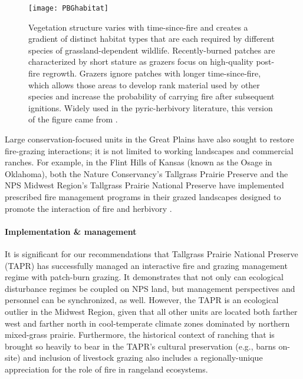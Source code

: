 \begin{figure}[!b]
	\center
	\texttt{[image: PBGhabitat]}
	\caption[Vegetation structure, grassland birds, and the fire-grazing interaction]
	{Vegetation structure varies with time-since-fire and creates a gradient of distinct habitat types that are each required by different species of grassland-dependent wildlife. 
	Recently-burned patches are characterized by short stature as grazers focus on high-quality post-fire regrowth. 
	Grazers ignore patches with longer time-since-fire, which allows those areas to develop rank material used by other species and increase the probability of carrying fire after subsequent ignitions.
	Widely used in the pyric-herbivory literature, this version of the figure came from \citet{fuhlendorf2009}.}
	\label{fig:habitat}
\end{figure}

Large conservation-focused units in the Great Plains have also sought to restore fire-grazing interactions; it is not limited to working landscapes and commercial ranches. 
For example, in the Flint Hills of Kansas (known as the Osage in Oklahoma), both the Nature Conservancy's Tallgrass Prairie Preserve and the NPS Midwest Region's Tallgrass Prairie National Preserve have implemented prescribed fire management programs in their grazed landscapes designed to promote the interaction of fire and herbivory \citep{hamilton2007, leis2013}. 

\paragraph{Implementation \& management}

It is significant for our recommendations that Tallgrass Prairie National Preserve (TAPR) has successfully managed an interactive fire and grazing management regime with patch-burn grazing. 
It demonstrates that not only can ecological disturbance regimes be coupled on NPS land, but management perspectives and personnel can be synchronized, as well. 
However, the TAPR is an ecological outlier in the Midwest Region, given that all other units are located both farther west and farther north in cool-temperate climate zones dominated by northern mixed-grass prairie. 
Furthermore, the historical context of ranching that is brought so heavily to bear in the TAPR's cultural preservation (e.g., barns on-site) and inclusion of livestock grazing also includes a regionally-unique appreciation for the role of fire in rangeland ecosystems. 

